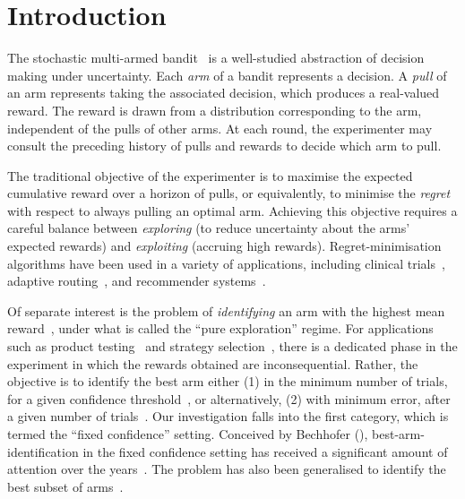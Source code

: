 \section{Introduction}
\label{sec:intro}
The stochastic multi-armed bandit~\citep{Robbins:1952,bib:mabdefbook} is
a well-studied abstraction of decision making under uncertainty. Each \emph{arm} of a bandit represents a decision. A \emph{pull} of an arm represents taking the associated decision, which produces a real-valued reward. The reward is drawn \iid from a distribution corresponding to the arm, independent of the pulls of other arms. At each round, the experimenter may consult the preceding history of pulls and rewards to decide which arm to pull.

The traditional objective of the experimenter is to maximise the expected cumulative reward over a horizon of pulls, or equivalently, to minimise the \textit{regret} with respect to always pulling an optimal arm. Achieving this objective requires a careful balance between \textit{exploring}  (to reduce uncertainty about the arms' expected rewards) and \textit{exploiting} (accruing high rewards). Regret-minimisation algorithms have been used in a variety of applications, including clinical trials~\citep{Robbins:1952}, adaptive routing~\citep{Awerbuch+K:2008}, and recommender systems~\citep{Li+CLS:2010}.

Of separate interest is the problem of \textit{identifying} an arm with the highest mean reward~\citep{Bechhofer:1958,Paulson:1964,bib:evendar1}, under what is called the ``pure exploration'' regime. For applications such as product testing~\citep{Audibert+BM:2010} and strategy selection~\citep{bib:sergiu}, there is a dedicated phase in the experiment in which the rewards obtained are inconsequential. Rather, the objective is to identify the best arm either (1) in the minimum number of trials, for a given confidence threshold~\citep{bib:evendar1,bib:explorem}, or alternatively, (2) with minimum error, after a given number of trials~\citep{Audibert+BM:2010,Carpentier+V:2015}. Our investigation falls into the first category, which is termed the ``fixed confidence'' setting. Conceived by Bechhofer (\citeyear{Bechhofer:1958}), 
best-arm-identification in the fixed confidence setting has received a significant amount of attention over the years~\citep{bib:evendar1,Gabillon+GLB:2011,Karnin+KS:2013,Jamieson+MNB:2014}.
The problem has also been generalised to identify the best subset of
arms~\citep{bib:explorem,bib:lucb}.

